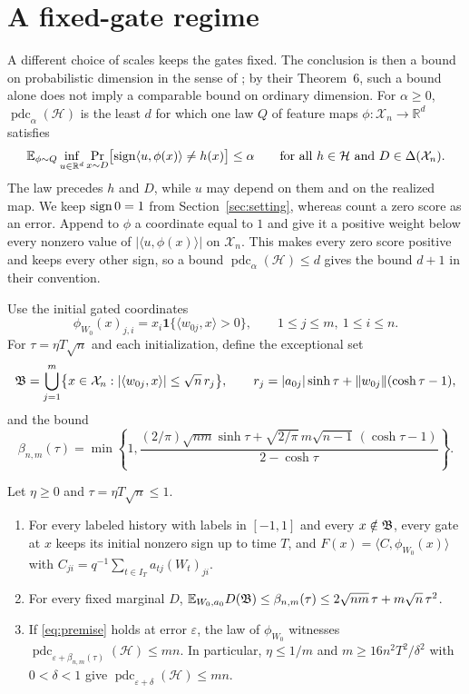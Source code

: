 \documentclass[11pt,letterpaper,pmlr,twoside]{jmlr}
\newcommand{\R}{\mathbb R}\newcommand{\E}{\mathbb E}
\newcommand{\X}{\mathcal X}\newcommand{\Hc}{\mathcal H}
\newcommand{\pdc}{\operatorname{pdc}}\newcommand{\sq}{\operatorname{sq}}
\newcommand{\ind}{\mathbf1}\newcommand{\eps}{\varepsilon}
\newcommand{\ip}[2]{\langle #1,#2\rangle}\newcommand{\norm}[1]{\lVert #1\rVert}
\begin{document}
\section{A fixed-gate regime}
\label{sec:gate}
A different choice of scales keeps the gates fixed. The conclusion is then a bound on probabilistic dimension in the sense of \citet{KMS20}; by their Theorem~6, such a bound alone does not imply a comparable bound on ordinary dimension. For $\alpha\ge0$, $\pdc_\alpha(\Hc)$ is the least $d$ for which one law $Q$ of feature maps $\phi:\X_n\to\R^d$ satisfies
\[
 \E_{\phi\sim Q}\inf_{u\in\R^d}\Pr_{x\sim D}\bigl[\sgn\ip u{\phi(x)}\ne h(x)\bigr]\le\alpha
 \qquad\text{for all }h\in\Hc\text{ and }D\in\Delta(\X_n).
\]
The law precedes $h$ and $D$, while $u$ may depend on them and on the realized map. We keep $\operatorname{sign}0=1$ from Section~\ref{sec:setting}, whereas \citet{KMS20} count a zero score as an error. Append to $\phi$ a coordinate equal to $1$ and give it a positive weight below every nonzero value of $|\ip u{\phi(x)}|$ on $\X_n$. This makes every zero score positive and keeps every other sign, so a bound $\pdc_\alpha(\Hc)\le d$ gives the bound $d+1$ in their convention.

Use the initial gated coordinates
\begin{equation}
 \phi_{W_0}(x)_{j,i}=x_i\ind\{\ip{w_{0j}}x>0\},\qquad 1\le j\le m,\ 1\le i\le n.
 \label{eq:gatefeat}
\end{equation}
For $\tau=\eta T\sqrt n$ and each initialization, define the exceptional set
\begin{equation}
 \Bfr=\bigcup_{j=1}^m\bigl\{x\in\X_n:|\ip{w_{0j}}x|\le\sqrt n\,r_j\bigr\},
 \qquad r_j=|a_{0j}|\sinh\tau+\norm{w_{0j}}(\cosh\tau-1),
 \label{eq:gateset}
\end{equation}
and the bound
\[
 \beta_{n,m}(\tau)=\min\left\{1,\frac{(2/\pi)\sqrt{nm}\sinh\tau+\sqrt{2/\pi}\,m\sqrt{n-1}\,(\cosh\tau-1)}{2-\cosh\tau}\right\}.
\]

\begin{theorem}
\label{thm:gate}
Let $\eta\ge0$ and $\tau=\eta T\sqrt n\le1$.
\begin{enumerate}
\item For every labeled history with labels in $[-1,1]$ and every $x\notin\mathfrak B$, every gate at $x$ keeps its initial nonzero sign up to time $T$, and $F(x)=\ip{C}{\phi_{W_0}(x)}$ with $C_{ji}=q^{-1}\sum_{t\in I_T}a_{tj}(W_t)_{ji}$.
\item For every fixed marginal $D$, $\E_{W_0,a_0}D(\Bfr)\le \beta_{n,m}(\tau)\le2\sqrt{nm}\,\tau+m\sqrt n\,\tau^2$.
\item If \eqref{eq:premise} holds at error $\eps$, the law of $\phi_{W_0}$ witnesses $\pdc_{\eps+\beta_{n,m}(\tau)}(\Hc)\le mn$. In particular, $\eta\le1/m$ and $m\ge16n^2T^2/\delta^2$ with $0<\delta<1$ give $\pdc_{\eps+\delta}(\Hc)\le mn$.
\end{enumerate}
\end{theorem}
\end{document}
